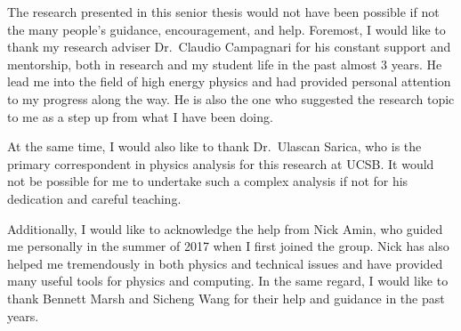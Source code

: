 \begin{acknowledgements}

    The research presented in this senior thesis would not have been possible if
    not the many people's guidance, encouragement, and help. Foremost, I 
    would like to thank my research adviser Dr.\ Claudio Campagnari for his
    constant support and mentorship, both in research and my student life 
    in the past almost 3 years. He lead me into the field of high energy
    physics and had provided personal attention to my progress along the way.
    He is also the one who suggested the research topic to me as a step up from
    what I have been doing.

    At the same time, I would also like to thank Dr.\ Ulascan Sarica, who is the 
    primary correspondent in physics analysis for this research at UCSB. It would 
    not be possible for
    me to undertake such a complex analysis if not for his dedication and careful
    teaching.

    Additionally, I would like to acknowledge the help from Nick Amin, who guided
    me personally in the summer of 2017 when I first joined the group. Nick has also
    helped me tremendously in both physics and technical issues and have provided many
    useful tools for physics and computing. In the same regard, I would like to thank 
    Bennett Marsh and Sicheng Wang for their help and guidance in the past years.


\end{acknowledgements} 
